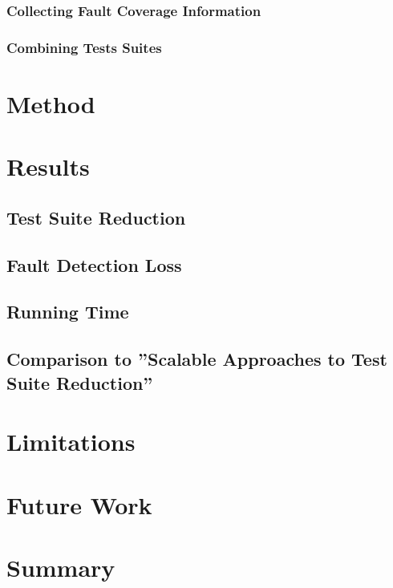 \documentclass[a4paper,10pt]{article}
\begin{document}
\subsubsection{Collecting Fault Coverage Information}


\subsubsection{Combining Tests Suites}

\section{Method}

\section{Results}

\subsection{Test Suite Reduction}

\subsection{Fault Detection Loss}

\subsection{Running Time}

\subsection{Comparison to ''Scalable Approaches to Test Suite Reduction''}

\section{Limitations}

\section{Future Work}

\section{Summary}



\end{document}
